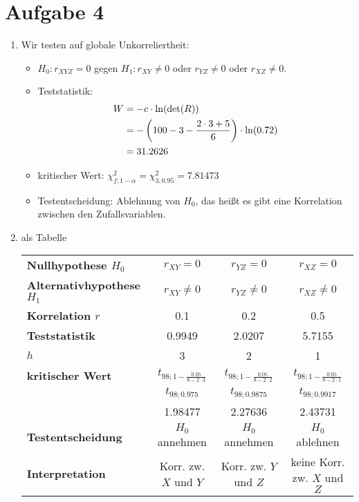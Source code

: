 \documentclass{article}
\begin{document}
	\section*{Aufgabe 4}
	\begin{enumerate}[label=(\alph*)]
		\item Wir testen auf globale Unkorreliertheit:
		\begin{itemize}
			\item $H_0: r_{XYZ}=0$ gegen $H_1: r_{XY}\neq 0$ oder $r_{YZ}\neq 0$ oder $r_{XZ}\neq 0$.
			\item Teststatistik:
			\begin{align}
				W &= -c \cdot \ln(\det(R)) \notag \\
				&= -\left(100-3-\frac{2\cdot 3+5}{6}\right) \cdot\ln(0.72) \notag \\
				&= 31.2626 \notag
			\end{align}
			\item kritischer Wert: $\chi_{f;1-\alpha}^2 = \chi_{3,0.95}^2 = 7.81473$
			\item Testentscheidung: Ablehnung von $H_0$, das heißt es gibt eine Korrelation zwischen den Zufallsvariablen.
		\end{itemize}
		\item als Tabelle
		\begin{center}
			\begin{tabular}{l|c|c|c}
				\textbf{Nullhypothese $H_0$} & $r_{XY} = 0$ & $r_{YZ} = 0$ & $r_{XZ} = 0$ \\
				\textbf{Alternativhypothese $H_1$} & $r_{XY} \neq 0$ & $r_{YZ} \neq 0$ & $r_{XZ} \neq 0$ \\
				\textbf{Korrelation $r$} & 0.1 & 0.2 & 0.5 \\
				\textbf{Teststatistik} & 0.9949 & 2.0207 & 5.7155 \\
				\textbf{$h$} & 3 & 2 & 1 \\
				\textbf{kritischer Wert} & $t_{98;1-\frac{0.05}{8-2\cdot 3}}$ & $t_{98;1-\frac{0.05}{8-2\cdot 2}}$ & $t_{98;1-\frac{0.05}{8-2\cdot 1}}$ \\
				& $t_{98;0.975}$ & $t_{98;0.9875}$ & $t_{98;0.9917}$ \\
				& 1.98477 & 2.27636 & 2.43731 \\
				\textbf{Testentscheidung} & $H_0$ annehmen & $H_0$ annehmen & $H_0$ ablehnen \\
				\textbf{Interpretation} & Korr. zw. $X$ und $Y$ & Korr. zw. $Y$ und $Z$ & keine Korr. zw. $X$ und $Z$
			\end{tabular}
		\end{center}
	\end{enumerate}
	
\end{document}

